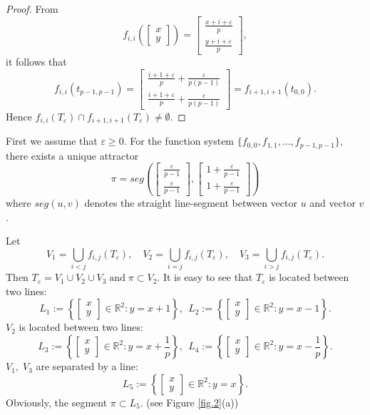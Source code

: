 \documentclass[12pt, reqno]{amsart}
\numberwithin{equation}{section}
\begin{document}
\begin{proof}
From
$$f_{i,i}\left(\left[\begin{array}{c}x\\y\end{array}\right]\right)=\left[\begin{array}{c}\frac{x+i+\varepsilon}p\\\frac{y+i+\varepsilon}p\end{array}\right],$$
it follows that $$f_{i,i}(t_{p-1,p-1})=\left[\begin{array}{c}\frac{i+1+\varepsilon}p+\frac{\varepsilon}{p(p-1)}\\ \frac{i+1+\varepsilon}p+\frac{\varepsilon}{p(p-1)}\end{array}\right]=f_{i+1,i+1}(t_{0,0}).$$
Hence  $f_{i,i}(T_{\varepsilon})\cap f_{i+1,i+1}(T_{\varepsilon})\neq\emptyset$.
\end{proof}


\bigskip


First we assume that $\varepsilon\geq 0$.
For the function system $\{f_{0,0},f_{1,1}, \dots, f_{p-1,p-1}\}$,
there exists a unique attractor
$$\pi=seg\left(\left[\begin{array}{c}\frac{\varepsilon}{p-1}\\ \frac{\varepsilon}{p-1}\end{array}\right],\left[\begin{array}{c}1+\frac{\varepsilon}{p-1}\\1+\frac{\varepsilon}{p-1}\end{array}\right]\right)$$
where $seg(u,v)$ denotes the straight line-segment between vector $u$ and vector $v$.

Let \[V_{1}=\bigcup_{i<j}f_{i,j}(T_{\varepsilon}),\quad  V_{2}=\bigcup_{i=j}f_{i,j}(T_{\varepsilon}),\quad  V_{3}=\bigcup_{i>j}f_{i,j}(T_{\varepsilon}).\]
Then $T_{\varepsilon}=V_{1}\cup V_{2}\cup V_{3} \;\text{and}\;\pi\subset V_{2}.$
It is easy to see that $T_{\varepsilon}$ is located between two lines:
$$L_{1}:=\left\{\left[\begin{array}{c}x\\y\end{array}\right]\in\mathbb{R}^{2}: y=x+1\right\},\ \ L_{2}:=\left\{\left[\begin{array}{c}x\\y\end{array}\right]\in\mathbb{R}^{2}: y=x-1\right\}.$$
$V_{2}$ is located between two lines:
$$L_{3}:=\left\{\left[\begin{array}{c}x\\y\end{array}\right]\in\mathbb{R}^{2}: y=x+\frac{1}{p}\right\},\ \ L_{4}:=\left\{\left[\begin{array}{c}x\\y\end{array}\right]\in\mathbb{R}^{2}: y=x-\frac{1}{p}\right\}.$$
$V_{1},\;V_{3}$ are separated by a line:
$$L_{5}:=\left\{\left[\begin{array}{c}x\\y\end{array}\right]\in\mathbb{R}^{2}: y=x\right\}.$$
Obviously, the segment $\pi\subset L_{5}$. (see Figure \ref{fig.2}(a))
\end{document}
